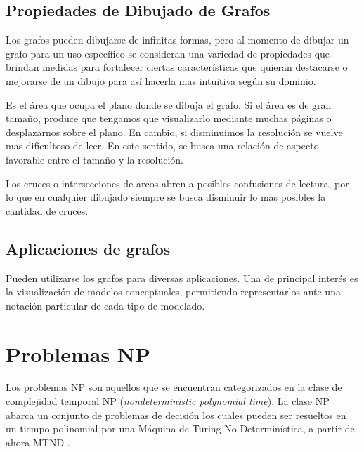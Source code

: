 
\subsection{Propiedades de Dibujado de Grafos}
\label{sec:propiedades_dibujado_grafos}
Los grafos pueden dibujarse de infinitas formas, pero al momento de dibujar un grafo para un uso específico se consideran una variedad de propiedades que brindan medidas para fortalecer ciertas características que quieran destacarse o mejorarse de un dibujo para así hacerla mas intuitiva según su dominio.\\

\begin{property}[Área]
	Es el área que ocupa el plano donde se dibuja el grafo. Si el área es de gran tamaño, produce que tengamos que visualizarlo mediante muchas páginas o desplazarnos sobre el plano. En cambio, si disminuimos la resolución se vuelve mas dificultoso de leer. En este sentido, se busca una relación de aspecto favorable entre el tamaño y la resolución.
\end{property}

\begin{property}
	Los cruces o intersecciones de arcos abren a posibles confusiones de lectura, por lo que en cualquier dibujado siempre se busca disminuir lo mas posibles la cantidad de cruces.
\end{property}

\subsection{Aplicaciones de grafos}
Pueden utilizarse los grafos para diversas aplicaciones. Una de principal interés es la visualización de modelos conceptuales, permitiendo representarlos ante una notación particular de cada tipo de modelado.


\section{Problemas NP}
\label{sec:problemas_np}
Los problemas NP son aquellos que se encuentran categorizados en la clase de complejidad temporal NP (\emph{nondeterministic polynomial  time}). La clase NP abarca un conjunto de problemas de decisión los cuales pueden ser resueltos en un tiempo polinomial por una Máquina de Turing No Determinística, a partir de ahora MTND \cite{arora2009computational}.

